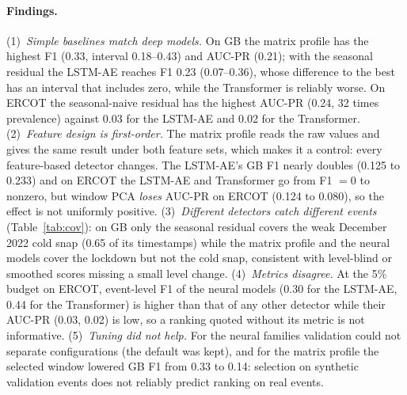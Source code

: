 \documentclass[10pt,twocolumn]{article}
\begin{document}
\paragraph{Findings.} (1)~\emph{Simple baselines match deep models.} On GB the matrix profile has the highest F1 (0.33, interval 0.18--0.43) and AUC-PR (0.21); with the seasonal residual the LSTM-AE reaches F1 0.23 (0.07--0.36), whose difference to the best has an interval that includes zero, while the Transformer is reliably worse. On ERCOT the seasonal-naive residual has the highest AUC-PR (0.24, 32 times prevalence) against 0.03 for the LSTM-AE and 0.02 for the Transformer. (2)~\emph{Feature design is first-order.} The matrix profile reads the raw values and gives the same result under both feature sets, which makes it a control: every feature-based detector changes. The LSTM-AE's GB F1 nearly doubles (0.125 to 0.233) and on ERCOT the LSTM-AE and Transformer go from F1 $=0$ to nonzero, but window PCA \emph{loses} AUC-PR on ERCOT (0.124 to 0.080), so the effect is not uniformly positive. (3)~\emph{Different detectors catch different events} (Table~\ref{tab:cov}): on GB only the seasonal residual covers the weak December 2022 cold snap (0.65 of its timestamps) while the matrix profile and the neural models cover the lockdown but not the cold snap, consistent with level-blind or smoothed scores missing a small level change. (4)~\emph{Metrics disagree.} At the 5\% budget on ERCOT, event-level F1 of the neural models (0.30 for the LSTM-AE, 0.44 for the Transformer) is higher than that of any other detector while their AUC-PR (0.03, 0.02) is low, so a ranking quoted without its metric is not informative. (5)~\emph{Tuning did not help.} For the neural families validation could not separate configurations (the default was kept), and for the matrix profile the selected window lowered GB F1 from 0.33 to 0.14: selection on synthetic validation events does not reliably predict ranking on real events.

\begin{table}[t]
\centering\scriptsize\setlength{\tabcolsep}{3pt}
\\[4pt]

\caption{Per-event coverage (share of an event's timestamps flagged; residual feature set, mean over seeds). ``Events hit'' counts events with any flag, so read it with the coverage values: a detector can hit an event with coverage near zero.}\label{tab:cov}
\end{table}
\end{document}
